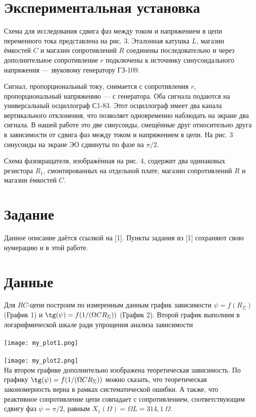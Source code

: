 \section{\label{sec:level1}Экспериментальная установка}

Схема для исследования сдвига фаз между током и напряжением в цепи переменного тока представлена на рис. 3. Эталонная катушка $L$, магазин ёмкостей $C$ и магазин сопротивлений $R$ соединены последовательно и через дополнительное сопротивление $r$ подключены к источнику синусоидального напряжения — звуковому генератору ГЗ-109.

Сигнал, пропорциональный току, снимается с сопротивления $r$, пропорциональный напряжению — с генератора. Оба сигнала подаются на универсальный осциллограф С1-83. Этот осциллограф имеет два канала вертикального отклонения, что позволяет одновременно наблюдать на экране два сигнала. В нашей работе это две синусоиды, смещённые друг относительно друга в зависимости от сдвига фаз между током и напряжением в цепи. На рис. 3 синусоиды на экране ЭО сдвинуты по фазе на $\pi /2$.

Схема фазовращателя, изображённая на рис. 4, содержит два одинаковых резистора $R_1$, смонтированных на отдельной плате, магазин сопротивлений $R$ и магазин ёмкостей $C$.

\section{\label{sec:level1}Задание}

Данное описание даётся ссылкой на [1]. Пункты задания из [1] сохраняют свою нумерацию и в этой работе.

\section{\label{sec:level1}Данные}

Для $RC$-цепи построим по измеренным данным график зависимости $\psi = f(R_{\Sigma})$ (График 1) и $\tg(\psi) = f(1/(\Omega C R_{\Sigma}))$ (График 2). Второй график выполним в логарифмической шкале ради упрощения анализа зависимости\\
\\
\texttt{[image: my\_plot1.png]}\\
\\
\texttt{[image: my\_plot2.png]}
\\

На втором графике дополнительно изображена теоретическая зависимость. По графику $\tg(\psi) = f(1/(\Omega C R_{\Sigma}))$ можно сказать, что теоретическая закономерность верна в рамках систематической ошибки. А также, что реактивное сопротивление цепи совпадает с сопротивлением, соответствующим сдвигу фаз $\psi = \pi/2$, равным $X_1(\Omega) = \Omega L = 314,1~\Omega$.

